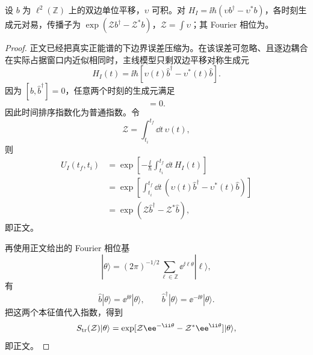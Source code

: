 \begin{proposition}[可交换双边平移生成元的精确传播]
设 $b$ 为 $\ell^2(\mathbb Z)$ 上的双边单位平移，$\upsilon$ 可积。对 $H_I=\ii\hbar(\upsilon b^\dagger-\upsilon^*b)$，各时刻生成元对易，传播子为 $\exp(\mathcal Zb^\dagger-\mathcal Z^*b)$，$\mathcal Z=\int\upsilon$；其 Fourier 相位为。
\end{proposition}
\begin{proof}
正文已经把真实正能谱的下边界误差压缩为。在该误差可忽略、且逐边耦合在实际占据窗口内近似相同时，主线模型只剩双边平移对称生成元
\begin{equation*}
H_I(t)=\ii\hbar[\upsilon(t)\hat b^\dagger-\upsilon^*(t)\hat b].
\end{equation*}
因为 $[\hat b,\hat b^\dagger]=0$，任意两个时刻的生成元满足
\begin{equation*}
[H_I(t),H_I(t')]=0.
\end{equation*}
因此时间排序指数化为普通指数。令
\begin{equation*}
\mathcal Z=\int_{t_i}^{t_f}\dd t\,\upsilon(t),
\end{equation*}
则
\begin{align*}
U_I(t_f,t_i)
&=\exp\!\left[-\frac{\ii}{\hbar}\int_{t_i}^{t_f}\dd t\,H_I(t)\right]\\
&=\exp\!\left[\int_{t_i}^{t_f}\dd t\,
(\upsilon(t)\hat b^\dagger-\upsilon^*(t)\hat b)\right]\\
&=\exp\!\left(\mathcal Z\hat b^\dagger-\mathcal Z^*\hat b\right),
\end{align*}
即正文。

再使用正文给出的 Fourier 相位基
\begin{equation*}
|\theta\rangle=(2\pi)^{-1/2}\sum_{\ell\in\mathbb Z}
 \ee^{\ii\ell\theta}|\ell\rangle,
\end{equation*}
有
\begin{equation*}
\hat b|\theta\rangle=\ee^{\ii\theta}|\theta\rangle,
\qquad
\hat b^\dagger|\theta\rangle=\ee^{-\ii\theta}|\theta\rangle.
\end{equation*}
把这两个本征值代入指数，得到
\begin{equation*}
S_{\rm tr}(\mathcal Z)|\theta\rangle
=\exp[\mathcal Z \ee^{-\ii\theta}-\mathcal Z^*\ee^{\ii\theta}]|\theta\rangle,
\end{equation*}
即正文。
\end{proof}


